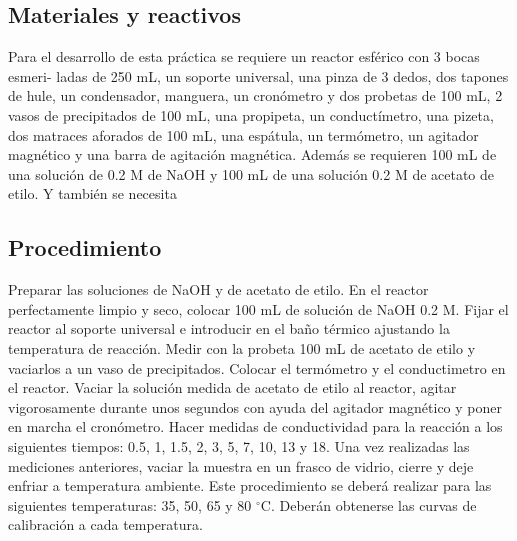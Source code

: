\documentclass[12pt,letterpaper]{article}
\begin{document}
    \subsection{Materiales y reactivos}
    \justify
    Para el desarrollo de esta práctica se requiere un reactor esférico con 3 bocas esmeri-
ladas de 250 mL, un soporte universal, una pinza de 3 dedos, dos tapones de hule, un condensador, manguera, un cronómetro y dos probetas de 100 mL, 2 vasos de precipitados de 100 mL, una propipeta, un conductímetro, una pizeta, dos matraces aforados de 100 mL, una espátula, un termómetro, un agitador magnético y una barra de agitación magnética. Además se requieren 100 mL de una solución de 0.2 M de NaOH y 100 mL de una solución 0.2 M de acetato de etilo. Y también se necesita
%
%
%
    \subsection{Procedimiento}
      \justify
    Preparar las soluciones de NaOH y de acetato de etilo. En el reactor perfectamente
limpio y seco, colocar 100 mL de solución de NaOH 0.2 M. Fijar el reactor al soporte
universal e introducir en el baño térmico ajustando la temperatura de reacción. Medir
con la probeta 100 mL de acetato de etilo y vaciarlos a un vaso de precipitados. Colocar
el termómetro y el conductimetro en el reactor. Vaciar la solución medida de acetato
de etilo al reactor, agitar vigorosamente durante unos segundos con ayuda del agitador
magnético y poner en marcha el cronómetro. Hacer medidas de conductividad para la
reacción a los siguientes tiempos: 0.5, 1, 1.5, 2, 3, 5, 7, 10, 13 y 18. Una vez realizadas
las mediciones anteriores, vaciar la muestra en un frasco de vidrio, cierre y deje enfriar
a temperatura ambiente. Este procedimiento se deberá realizar para las siguientes
temperaturas: 35, 50, 65 y 80 $^{\circ}$C. Deberán obtenerse las curvas de calibración a cada
temperatura.
\end{document}
